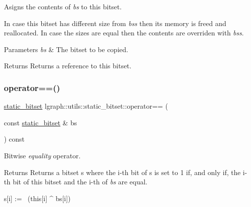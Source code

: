 Asigns the contents of {\itshape bs} to this bitset. 

In case this bitset has different size from {\itshape bs\textquotesingle{}s} then its memory is freed and reallocated. In case the sizes are equal then the contents are overriden with {\itshape bs\textquotesingle{}s}.


\begin{DoxyParams}{Parameters}
{\em bs} & The bitset to be copied. \\
\hline
\end{DoxyParams}
\begin{DoxyReturn}{Returns}
Returns a reference to this bitset. 
\end{DoxyReturn}
\mbox{\label{classlgraph_1_1utils_1_1static__bitset_a901bec6cc27e6b521d33b8658223e1ea}} 
\subsubsection{\texorpdfstring{operator==()}{operator==()}}
{\footnotesize\ttfamily \hyperlink{classlgraph_1_1utils_1_1static__bitset}{static\+\_\+bitset} lgraph\+::utils\+::static\+\_\+bitset\+::operator== (\begin{DoxyParamCaption}\item[{const \hyperlink{classlgraph_1_1utils_1_1static__bitset}{static\+\_\+bitset} \&}]{bs }\end{DoxyParamCaption}) const}



Bitwise {\itshape equality} operator. 

\begin{DoxyReturn}{Returns}
Returns a bitset s where the i-\/th bit of s is set to 1 if, and only if, the i-\/th bit of this bitset and the i-\/th of {\itshape bs} are equal. \begin{DoxyVerb}s[i] := ~(this[i] ^ bs[i])\end{DoxyVerb}
 
\end{DoxyReturn}
\mbox{\label{classlgraph_1_1utils_1_1static__bitset_a5d4ca0e342e0b0094f20925a62b2068d}} 
